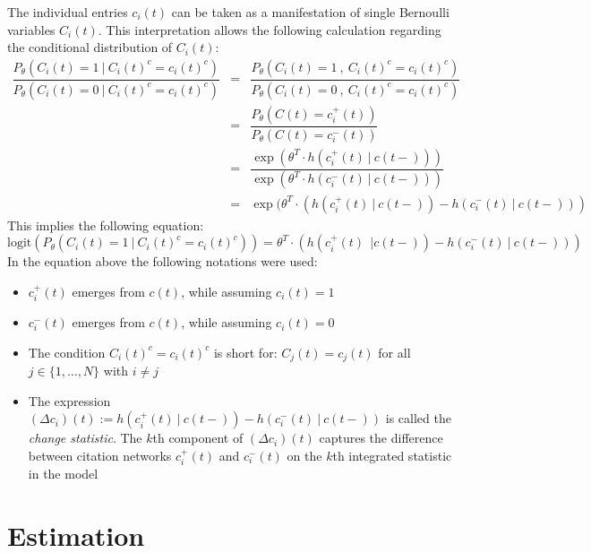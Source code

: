 \documentclass[headsepline=true, abstracton]{scrartcl}
\begin{document}
The individual entries $c_i(t)$ can be taken as a manifestation of single Bernoulli variables $C_i(t)$. This interpretation allows the following calculation regarding the conditional distribution of $C_i(t)$:
%
\begin{eqnarray*}
\dfrac{P_{\theta}(C_i(t)=1 ~|~ C_i(t)^c=c_i(t)^c)}{P_{\theta}(C_i(t)=0 ~|~ C_i(t)^c=c_i(t)^c)} &=&
\dfrac{P_{\theta}(C_i(t)=1 ~,~ C_i(t)^c=c_i(t)^c)}{P_{\theta}(C_i(t)=0 ~,~ C_i(t)^c=c_i(t)^c)} \\
                           &=&\dfrac{P_{\theta}(C(t)= c_i^+(t))}{P_{\theta}(C(t)=c_i^-(t))}\\
                           &=&\dfrac{\exp(\theta^T \cdot h(c_i^+(t)~|~c(t-)))}{\exp(\theta^T \cdot h(c_i^-(t)~|~c(t-)))}\\
                           &=& \exp(\theta^T \cdot (h(c_i^+(t)~|~c(t-)) - h(c_i^-(t)~|~c(t-)))
\end{eqnarray*}
%
This implies the following equation:
%
\begin{equation}
\text{logit}(P_{\theta}(C_i(t)=1 ~|~ C_i(t)^c=c_i(t)^c))= \theta^T \cdot (h(c_i^+(t)~~|c(t-)) - h(c_i^-(t)~|~c(t-)))
\label{Logit}
\end{equation}
In the equation above the following notations were used:
%
\begin{itemize}
\item $c_i^+(t)$ emerges from $c(t)$, while assuming $c_i(t)=1$
\item $c_i^-(t)$ emerges from $c(t)$, while assuming $c_i(t)=0$
\item The condition $C_i(t)^c=c_i(t)^c$ is short for: $C_j(t)=c_j(t)$ for all $j\in \{1,\dots,N\}$ with $i \neq j$
\item The expression $(\Delta c_i)(t):=h(c_i^+(t)~|~c(t-)) - h(c_i^-(t)~|~c(t-))$ is called the \textit{change statistic}. The $k$th component of $(\Delta c_i)(t)$ captures the difference between citation networks $c_i^+(t)$ and $c_i^-(t)$ on the $k$th integrated statistic in the model
\end{itemize}



\section{Estimation}

\end{document}
